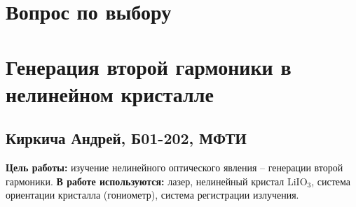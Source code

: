 


\section*{Вопрос по выбору}	
\section*{Генерация второй гармоники в нелинейном кристалле}
\subsection*{Киркича Андрей, Б01-202, МФТИ}
\n\n
\textbf{Цель работы: }
изучение нелинейного оптического явления -- генерации второй гармоники.
\n\n
\textbf{В работе используются: }
лазер, нелинейный кристал LiIO$_3$, система ориентации кристалла (гониометр), система регистрации излучения.

